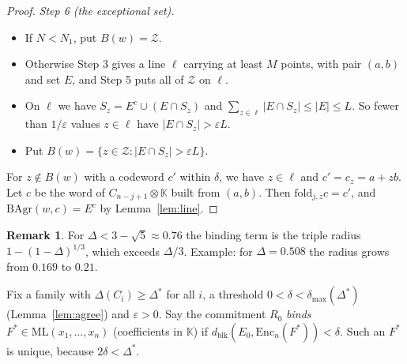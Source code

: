 \documentclass[11pt]{article}
\theoremstyle{definition}
\newtheorem{remark}[theorem]{Remark}
\newcommand{\K}{\mathbb{K}}
\newcommand{\ML}{\mathrm{ML}}
\newcommand{\Enc}{\mathrm{Enc}}
\newcommand{\fold}{\mathrm{fold}}
\newcommand{\dblk}{d_{\mathrm{blk}}}
\begin{document}
\begin{proof}
\emph{Step 6 (the exceptional set).}
\begin{itemize}[leftmargin=*]
\item If $N<N_1$, put $B(w)=\mathcal{Z}$.
\item Otherwise Step 3 gives a line $\ell$ carrying at least $M$ points, with pair $(a,b)$ and set $E$, and Step 5 puts all of $\mathcal{Z}$ on $\ell$.
\item On $\ell$ we have $S_z=E^{c}\cup(E\cap S_z)$ and $\sum_{z\in\ell}|E\cap S_z|\le|E|\le L$. So
fewer than $1/\varepsilon$ values $z\in\ell$ have $|E\cap S_z|>\varepsilon L$.
\item Put $B(w)=\{z\in\mathcal{Z}:|E\cap S_z|>\varepsilon L\}$.
\end{itemize}
For $z\notin B(w)$ with a codeword $c'$ within $\delta$, we have $z\in\ell$ and $c'=c_z=a+zb$. Let
$c$ be the word of $C_{n-j+1}\otimes\K$ built from $(a,b)$. Then $\fold_{j,z}c=c'$, and
$\mathrm{BAgr}(w,c)=E^{c}$ by Lemma~\ref{lem:line}.
\end{proof}

\begin{remark}
For $\Delta<3-\sqrt5\approx0.76$ the binding term is the triple radius $1-(1-\Delta)^{1/3}$, which
exceeds $\Delta/3$. Example: for $\Delta=0.508$ the radius grows from $0.169$ to $0.21$.
\end{remark}

Fix a family with $\Delta(C_i)\ge\Delta^{*}$ for all $i$, a threshold $0<\delta<\delta_{\max}(\Delta^{*})$ (Lemma~\ref{lem:agree}) and
$\varepsilon>0$. Say the commitment $R_0$ \emph{binds} $F^{*}\in\ML(x_1,\dots,x_n)$ (coefficients in $\K$) if $\dblk(E_0,\Enc_n(F^{*}))<\delta$.
Such an $F^{*}$ is unique, because $2\delta<\Delta^{*}$.
\end{document}
